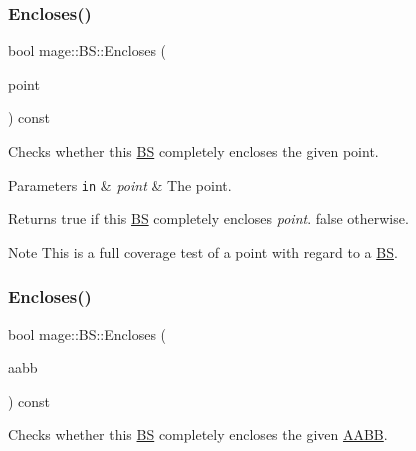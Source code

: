 \subsubsection{\texorpdfstring{Encloses()}{Encloses()}\hspace{0.1cm}{\footnotesize\ttfamily [2/4]}}
{\footnotesize\ttfamily bool mage\+::\+B\+S\+::\+Encloses (\begin{DoxyParamCaption}\item[{F\+X\+M\+V\+E\+C\+T\+OR}]{point }\end{DoxyParamCaption}) const\hspace{0.3cm}{\ttfamily [noexcept]}}

Checks whether this \hyperlink{structmage_1_1_b_s}{BS} completely encloses the given point.


\begin{DoxyParams}[1]{Parameters}
\mbox{\tt in}  & {\em point} & The point. \\
\hline
\end{DoxyParams}
\begin{DoxyReturn}{Returns}
{\ttfamily true} if this \hyperlink{structmage_1_1_b_s}{BS} completely encloses {\itshape point}. {\ttfamily false} otherwise. 
\end{DoxyReturn}
\begin{DoxyNote}{Note}
This is a full coverage test of a point with regard to a \hyperlink{structmage_1_1_b_s}{BS}. 
\end{DoxyNote}
\hypertarget{structmage_1_1_b_s_ac646d715cc59c4ac7c324696fbf00ba8}{}\label{structmage_1_1_b_s_ac646d715cc59c4ac7c324696fbf00ba8} 
\subsubsection{\texorpdfstring{Encloses()}{Encloses()}\hspace{0.1cm}{\footnotesize\ttfamily [3/4]}}
{\footnotesize\ttfamily bool mage\+::\+B\+S\+::\+Encloses (\begin{DoxyParamCaption}\item[{const \hyperlink{structmage_1_1_a_a_b_b}{A\+A\+BB} \&}]{aabb }\end{DoxyParamCaption}) const\hspace{0.3cm}{\ttfamily [noexcept]}}

Checks whether this \hyperlink{structmage_1_1_b_s}{BS} completely encloses the given \hyperlink{structmage_1_1_a_a_b_b}{A\+A\+BB}.


